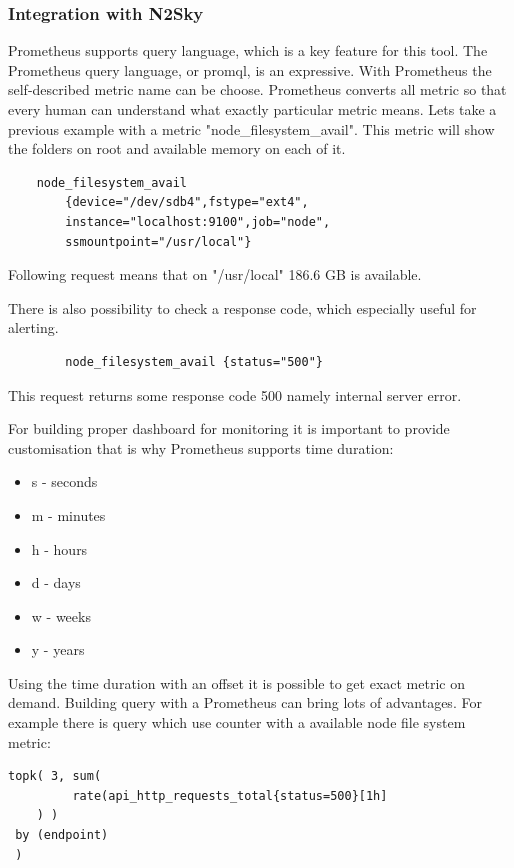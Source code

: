 \subsubsection{Integration with N2Sky}\label{Integration with N2Sky}

Prometheus supports query language, which is a key feature for this tool. The Prometheus query language, or promql, is an expressive. 
With Prometheus the self-described metric name can be choose. Prometheus converts all metric so that every human can understand what exactly particular metric means. Lets take a previous example with a metric "node\_filesystem\_avail". This metric will show the folders on root and available memory on each of it.

\begin{lstlisting}
	node_filesystem_avail 
		{device="/dev/sdb4",fstype="ext4",
		instance="localhost:9100",job="node",
		ssmountpoint="/usr/local"}
\end{lstlisting}

Following request means that on "/usr/local" 186.6 GB is available. 

There is also possibility to check a response code, which especially useful for alerting. 

\begin{lstlisting}
		node_filesystem_avail {status="500"}
\end{lstlisting}

This request returns some response code 500 namely internal server error. 

For building proper dashboard for monitoring it is important to provide customisation that is why Prometheus supports time duration:

\begin{itemize}
\item s - seconds
\item m - minutes
\item h - hours
\item d - days
\item w - weeks
\item y - years
\end{itemize}

Using the time duration with an offset it is possible to get exact metric on demand. 
Building query with a Prometheus can bring lots of advantages. For example there is query which use counter with a available node file system metric:

\begin{lstlisting}
topk( 3, sum(
		 rate(api_http_requests_total{status=500}[1h]
	) )
 by (endpoint)
 )
\end{lstlisting}

